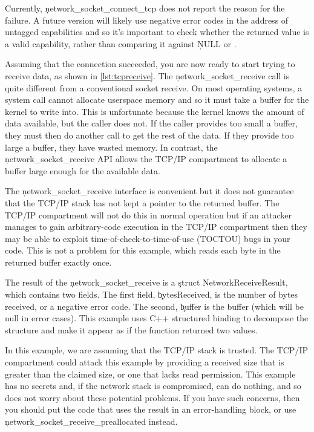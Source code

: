 \begin{note}
Currently, \c{network_socket_connect_tcp} does not report the reason for the failure.
A future version will likely use negative error codes in the address of untagged capabilities and so it's important to check whether the returned value is a valid capability, rather than comparing it against \c{NULL} or .
\end{note}

Assuming that the connection succeeded, you are now ready to start trying to receive data, as shown in \ref{lst:tcpreceive}.
The \c{network_socket_receive} call is quite different from a conventional socket receive.
On most operating systems, a system call cannot allocate userspace memory and so it must take a buffer for the kernel to write into.
This is unfortunate because the kernel knows the amount of data available, but the caller does not.
If the caller provides too small a buffer, they must then do another call to get the rest of the data.
If they provide too large a buffer, they have wasted memory.
In contrast, the \c{network_socket_receive} API allows the TCP/IP compartment to allocate a buffer large enough for the available data.

\codelisting[filename=examples/tcp/tcp.cc,marker=receive,label=lst:tcpreceive,caption="Receiving data from a remote server."]{}

\begin{caution}
The \c{network_socket_receive} interface is convenient but it does not guarantee that the TCP/IP stack has not kept a pointer to the returned buffer.
The TCP/IP compartment will not do this in normal operation but if an attacker manages to gain arbitrary-code execution in the TCP/IP compartment then they may be able to exploit time-of-check-to-time-of-use (TOCTOU) bugs in your code.
This is not a problem for this example, which reads each byte in the returned buffer exactly once.
\end{caution}

The result of the \c{network_socket_receive} is a \c{struct NetworkReceiveResult}, which contains two fields.
The first field, \c{bytesReceived}, is the number of bytes received, or a negative error code.
The second, \c{buffer} is the buffer (which will be null in error cases).
This example uses C++ structured binding to decompose the structure and make it appear as if the function returned two values.

In this example, we are assuming that the TCP/IP stack is trusted.
The TCP/IP compartment could attack this example by providing a received size that is greater than the claimed size, or one that lacks read permission.
This example has no secrets and, if the network stack is compromised, can do nothing, and so does not worry about these potential problems.
If you have such concerns, then you should put the code that uses the result in an error-handling block, or use \c{network_socket_receive_preallocated} instead.

